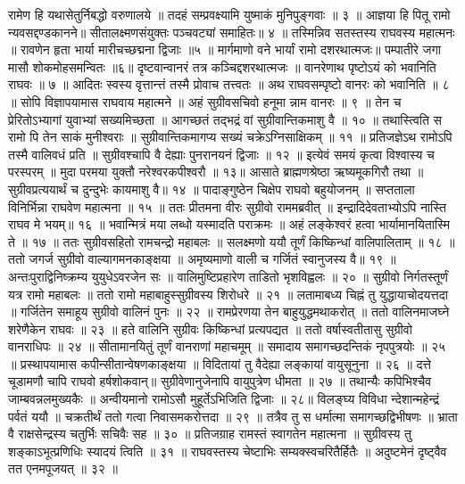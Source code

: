 रामेण हि यथासेतुर्निबद्धो वरुणालये ॥
तदहं सम्प्रवक्ष्यामि युष्माकं मुनिपुङ्गवाः ॥ ३ ॥
आज्ञया हि पितू रामो न्यवसद्दण्डकानने॥
सीतालक्ष्मणसंयुक्तः पञ्चवट्यां समाहितः॥ ४ ॥
तस्मिन्निव सतस्तस्य राघवस्य महात्मनः ॥
रावणेन हृता भार्या मारीचच्छद्मना द्विजाः ॥५ ॥
मार्गमाणो वने भार्यां रामो दशरथात्मजः॥
पम्पातीरे जगा मासौ शोकमोहसमन्वितः ॥६॥
दृष्टवान्वानरं तत्र कञ्चिद्दशरथात्मजः ॥
वानरेणाथ पृष्टोऽयं को भवानिति राघवः ॥ ७ ॥
आदितः स्वस्य वृत्तान्त्तं तस्मै प्रोवाच तत्त्वतः ॥
अथ राघवसम्पृष्टो वानरः को भवानिति ॥ ८ ॥
सोपि विज्ञापयामास राघवाय महात्मने ॥
अहं सुग्रीवसचिवो हनूमा न्नाम वानरः ॥ ९ ॥
तेन च प्रेरितोऽभ्यागां युवाभ्यां सख्यमिच्छता ॥
आगच्छतं तद्भद्रं वां सुग्रीवान्तिकमाशु वै ॥ १० ॥
तथास्त्विति स रामो पि तेन साकं मुनीश्वराः ॥
सुग्रीवान्तिकमागप्य सख्यं चक्रेऽग्निसाक्षिकम् ॥ ११ ॥
प्रतिजज्ञेऽथ रामोऽपि तस्मै वालिवधं प्रति ॥
सुग्रीवश्चापि वै देह्याः पुनरानयनं द्विजाः ॥ १२ ॥
इत्येवं समयं कृत्वा विश्वास्य च परस्परम् ॥
मुदा परमया युक्तौ नरेश्वरकपीश्वरौ ॥ १३॥
आसाते ब्राह्मणश्रेष्ठा ऋष्यमूकगिरौ तथा ॥
सुग्रीवप्रत्ययार्थं च दुन्दुभेः कायमाशु वै॥ १४ ॥
पादाङ्गुष्ठेन चिक्षेप राघवो बहुयोजनम् ॥
सप्तताला विनिर्भिन्ना राघवेण महात्मना ॥ १५ ॥
ततः प्रीतमना वीरः सुग्रीवो राममब्रवीत् ॥
इन्द्रादिदेवताभ्योऽपि नास्ति राघव मे भयम्॥ १६ ॥
भवान्मित्रं मया लब्धो यस्मादति पराक्रमः ॥
अहं लङ्केश्वरं हत्वा भार्यामानयितास्मि ते ॥ १७ ॥
ततः सुग्रीवसहितो रामचन्द्रो महाबलः ॥
सलक्ष्मणो ययौ तूर्णं किष्किन्धां वालिपालिताम् ॥ १८ ॥
ततो जगर्ज सुग्रीवो वाल्यागमनकाङ्क्षया ॥
अमृष्यमाणो वाली च गर्जितं स्वानुजस्य वै॥ १९ ॥
अन्तःपुराद्विनिष्क्रम्य युयुधेऽवरजेन सः ॥
वालिमुष्टिप्रहारेण ताडितो भृशविह्वलः ॥ २० ॥
सुग्रीवो निर्गतस्तूर्णं यत्र रामो महाबलः ॥
ततो रामो महाबाहुस्सुग्रीवस्य शिरोधरे ॥ २१ ॥
लतामाबध्य चिह्नं तु युद्धायाचोदयत्तदा ॥
गर्जितेन समाहूय सुग्रीवो वालिनं पुनः ॥ २२ ॥
रामप्रेरणया तेन बाहुयुद्धमथाकरोत् ॥
ततो वालिनमाजघ्ने शरेणैकेन राघवः ॥ २३ ॥
हते वालिनि सुग्रीवः किष्किन्धां प्रत्यपद्यत ॥
ततो वर्षास्वतीतासु सुग्रीवो वानराधिपः ॥ २४ ॥
सीतामानयितुं तूर्णं वानराणां महाचमूम् ॥
समादाय समागच्छदन्तिकं नृपपुत्रयोः ॥ २५ ॥
प्रस्थापयामास कपीन्सीतान्वेषणकाङ्क्षया ॥
विदितायां तु वैदेह्या लङ्कायां वायुसूनुना ॥ २६ ॥
दत्ते चूडामणौ चापि राघवो हर्षशोकवान्॥
सुग्रीवेणानुजेनापि वायुपुत्रेण धीमता ॥ २७ ॥
तथान्यैः कपिभिश्चैव जाम्बवन्नलमुख्यकैः ॥
अन्वीयमानो रामोऽसौ मुहूर्तेऽभिजिति द्विजाः ॥ २८॥
विलङ्घ्य विविधा न्देशान्महेन्द्रं पर्वतं ययौ ॥
चक्रतीर्थं ततो गत्वा निवासमकरोत्तदा ॥ २९ ॥
तत्रैव तु स धर्मात्मा समागच्छद्विभीषणः ॥
भ्राता वै राक्षसेन्द्रस्य चतुर्भिः सचिवैः सह ॥ ३० ॥
प्रतिजग्राह रामस्तं स्वागतेन महात्मना ॥
सुग्रीवस्य तु शङ्काऽभूत्प्रणिधिः स्यादयं त्विति ॥ ३१ ॥
राघवस्तस्य चेष्टाभिः सम्यक्स्वचरितैर्हितैः ॥
अदुष्टमेनं दृष्ट्वैव तत एनमपूजयत् ॥ ३२ ॥
